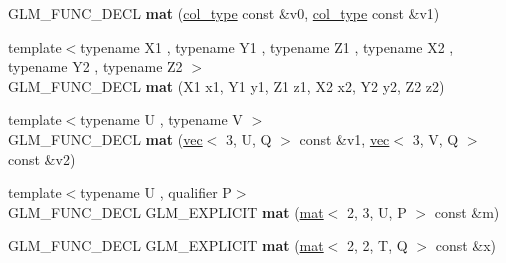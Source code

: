 \begin{DoxyCompactItemize}
\item 
\mbox{\label{structglm_1_1mat_3_012_00_013_00_01T_00_01Q_01_4_a47fe8fe8c60d7a0e166740332924a896}} 
G\+L\+M\+\_\+\+F\+U\+N\+C\+\_\+\+D\+E\+CL {\bfseries mat} (\hyperlink{structglm_1_1vec_3_013_00_01T_00_01Q_01_4}{col\+\_\+type} const \&v0, \hyperlink{structglm_1_1vec_3_013_00_01T_00_01Q_01_4}{col\+\_\+type} const \&v1)
\item 
\mbox{\label{structglm_1_1mat_3_012_00_013_00_01T_00_01Q_01_4_a6ad666b7cc2662ce5fce7cfa21320bbd}} 
{\footnotesize template$<$typename X1 , typename Y1 , typename Z1 , typename X2 , typename Y2 , typename Z2 $>$ }\\G\+L\+M\+\_\+\+F\+U\+N\+C\+\_\+\+D\+E\+CL {\bfseries mat} (X1 x1, Y1 y1, Z1 z1, X2 x2, Y2 y2, Z2 z2)
\item 
\mbox{\label{structglm_1_1mat_3_012_00_013_00_01T_00_01Q_01_4_a1e3ec729ec40ebfa5c9b463395ab0e25}} 
{\footnotesize template$<$typename U , typename V $>$ }\\G\+L\+M\+\_\+\+F\+U\+N\+C\+\_\+\+D\+E\+CL {\bfseries mat} (\hyperlink{structglm_1_1vec}{vec}$<$ 3, U, Q $>$ const \&v1, \hyperlink{structglm_1_1vec}{vec}$<$ 3, V, Q $>$ const \&v2)
\item 
\mbox{\label{structglm_1_1mat_3_012_00_013_00_01T_00_01Q_01_4_aaa83587373e6f4ce044e396e1a118366}} 
{\footnotesize template$<$typename U , qualifier P$>$ }\\G\+L\+M\+\_\+\+F\+U\+N\+C\+\_\+\+D\+E\+CL G\+L\+M\+\_\+\+E\+X\+P\+L\+I\+C\+IT {\bfseries mat} (\hyperlink{structglm_1_1mat}{mat}$<$ 2, 3, U, P $>$ const \&m)
\item 
\mbox{\label{structglm_1_1mat_3_012_00_013_00_01T_00_01Q_01_4_a659e4e84dfcbf92c95feca87446c5953}} 
G\+L\+M\+\_\+\+F\+U\+N\+C\+\_\+\+D\+E\+CL G\+L\+M\+\_\+\+E\+X\+P\+L\+I\+C\+IT {\bfseries mat} (\hyperlink{structglm_1_1mat}{mat}$<$ 2, 2, T, Q $>$ const \&x)
\item 
\mbox{\label{structglm_1_1mat_3_012_00_013_00_01T_00_01Q_01_4_a4b10a0e6986539582ac48da10afccd16}} 

\end{DoxyCompactItemize}
